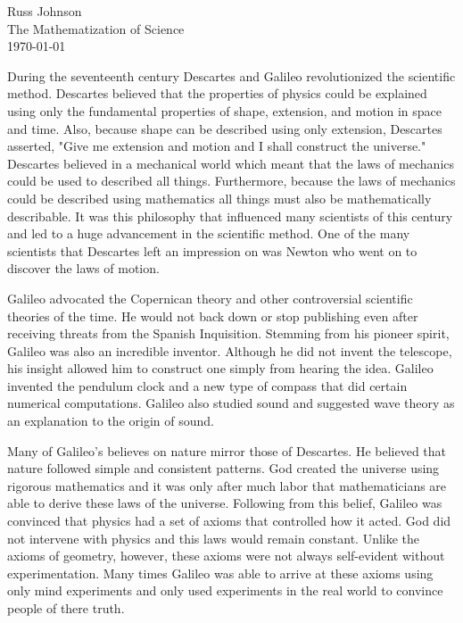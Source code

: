 \documentclass[10pt]{article}
\begin{document}
\begin{flushright}
Russ Johnson\\
The Mathematization of Science\\
\today\\
\end{flushright}

\begin{doublespace}
During the seventeenth century Descartes and Galileo revolutionized the scientific method. Descartes believed that the properties of physics could be explained using only the fundamental properties of shape, extension, and motion in space and time. Also, because shape can be described using only extension, Descartes asserted, "Give me extension and motion and I shall construct the universe." Descartes believed in a mechanical world which meant that the laws of mechanics could be used to described all things. Furthermore, because the laws of mechanics could be described using mathematics all things must also be mathematically describable. It was this philosophy that influenced many scientists of this century and led to a huge advancement in the scientific method. One of the many scientists that Descartes left an impression on was Newton who went on to discover the laws of motion.

Galileo advocated the Copernican theory and other controversial scientific theories of the time. He would not back down or stop publishing even after receiving threats from the Spanish Inquisition. Stemming from his pioneer spirit, Galileo was also an incredible inventor. Although he did not invent the telescope, his insight allowed him to construct one simply from hearing the idea.  Galileo invented the pendulum clock and a new type of compass that did certain numerical computations. Galileo also studied sound and suggested wave theory as an explanation to the origin of sound. 

Many of Galileo's believes on nature mirror those of Descartes. He believed that nature followed simple and consistent patterns. God created the universe using rigorous mathematics and it was only after much labor that mathematicians are able to derive these laws of the universe. Following from this belief, Galileo was convinced that physics had a set of axioms that controlled how it acted. God did not intervene with physics and this laws would remain constant. Unlike the axioms of geometry, however, these axioms were not always self-evident without experimentation. Many times Galileo was able to arrive at these axioms using only mind experiments and only used experiments in the real world to convince people of there truth. 


\end{doublespace}
\end{document}
